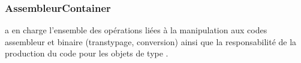 \subsubsection{AssembleurContainer}
 a en charge l'ensemble des opérations liées à la manipulation aux codes assembleur et binaire (transtypage, conversion) ainsi que la responsabilité de la production du code pour les objets de type .

